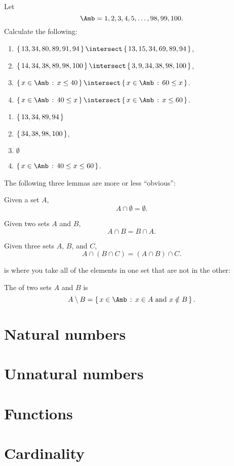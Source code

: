 \begin{example}
  Let $$\Amb = {1,2,3,4,5,\dots,98,99,100}.$$ Calculate the following:

  \begin{enumerate}
  \item $\mset{13,34,80,89,91,94} \intersect \mset{13,15,34,69,89,94}$,
  \item $\mset{14,34,38,89,98,100} \intersect \mset{3,9,34,38,98,100}$,
  \item $\scomp{x \in \Amb}{x \le 40} \intersect \scomp{x \in \Amb}{60 \le x}$.
  \item $\scomp{x \in \Amb}{40 \le x} \intersect \scomp{x \in \Amb}{x \le 60}$.
  \end{enumerate}

  \begin{solution}
    \begin{enumerate}
    \item $\left\{ \, 13,34,89,94 \, \right\}$
    \item $\left\{ \, 34,38,98,100 \, \right\}$,
    \item $\emptyset$
    \item $\scomp{x \in \Amb}{40 \le x \le 60}$.
    \end{enumerate}
  \end{solution}
\end{example}

The following three lemmas are more or less ``obvious'':

\begin{lemma}
  Given a set $A$, $$A \cap \emptyset = \emptyset.$$
\end{lemma}
\begin{lemma}
  Given two sets $A$ and $B$, $$A \cap B = B \cap A.$$
\end{lemma}
\begin{lemma}
  Given three sets $A$, $B$, and $C$, $$A \cap (B \cap C) = (A \cap B)
  \cap C.$$
\end{lemma}

  is where you take all of the elements in one set that
are not in the other:

\begin{definition}
  The  of two sets $A$ and $B$ is
  $$A \setminus B = \scomp{x \in \Amb}{x \in A \tand x \notin B}.$$
\end{definition}



\section{Natural numbers}
\label{s:nats}
\label{s:induction}

\section{Unnatural numbers}
\label{s:unnats}
\label{s:other-numbers}

\section{Functions}
\label{s:functions}

\section{Cardinality}
\label{s:cardinality}
